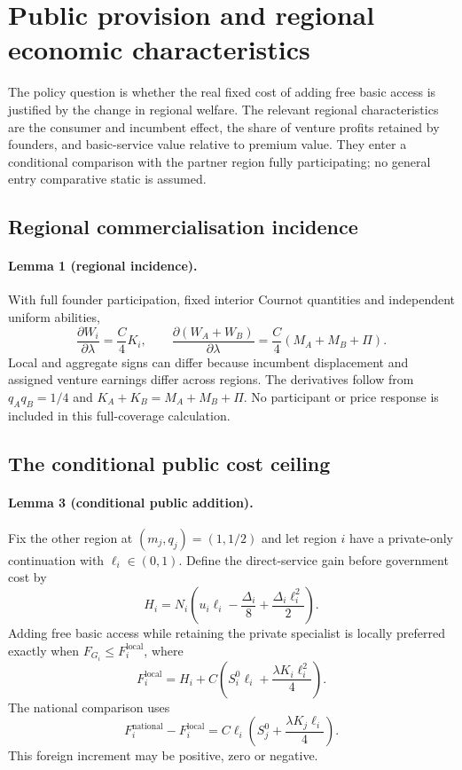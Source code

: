 \section{Public provision and regional economic characteristics}\label{sec:propositions}
The policy question is whether the real fixed cost of adding free basic access is justified by the change in regional welfare. The relevant regional characteristics are the consumer and incumbent effect, the share of venture profits retained by founders, and basic-service value relative to premium value. They enter a conditional comparison with the partner region fully participating; no general entry comparative static is assumed.

\subsection{Regional commercialisation incidence}
\paragraph{Lemma 1 (regional incidence).}
With full founder participation, fixed interior Cournot quantities and independent uniform abilities,
\begin{equation}
 \frac{\partial W_i}{\partial\lambda}=\frac{C}{4}K_i,\qquad
 \frac{\partial(W_A+W_B)}{\partial\lambda}
 =\frac{C}{4}(M_A+M_B+\Pi).
 \label{eq:P1}
\end{equation}
Local and aggregate signs can differ because incumbent displacement and assigned venture earnings differ across regions.
The derivatives follow from $q_Aq_B=1/4$ and $K_A+K_B=M_A+M_B+\Pi$.
No participant or price response is included in this full-coverage calculation.


\subsection{The conditional public cost ceiling}
\paragraph{Lemma 3 (conditional public addition).}
Fix the other region at $(m_j,q_j)=(1,1/2)$ and let region $i$ have a private-only continuation with $\ell_i\in(0,1)$.
Define the direct-service gain before government cost by
\begin{equation}
 H_i=N_i\left(u_i\ell_i-\frac{\Delta_i}{8}
                         +\frac{\Delta_i\ell_i^2}{2}\right).
 \label{eq:H}
\end{equation}
Adding free basic access while retaining the private specialist is locally preferred exactly when $F_{G_i}\leq F_i^{\mathrm{local}}$, where
\begin{equation}
 F_i^{\mathrm{local}}=H_i+C\left(S_i^0\ell_i+
                          \frac{\lambda K_i\ell_i^2}{4}\right).
 \label{eq:localcutoff}
\end{equation}
The national comparison uses
\begin{equation}
 F_i^{\mathrm{national}}-F_i^{\mathrm{local}}
 =C\ell_i\left(S_j^0+\frac{\lambda K_j\ell_i}{4}\right).
 \label{eq:wedge}
\end{equation}
This foreign increment may be positive, zero or negative.

